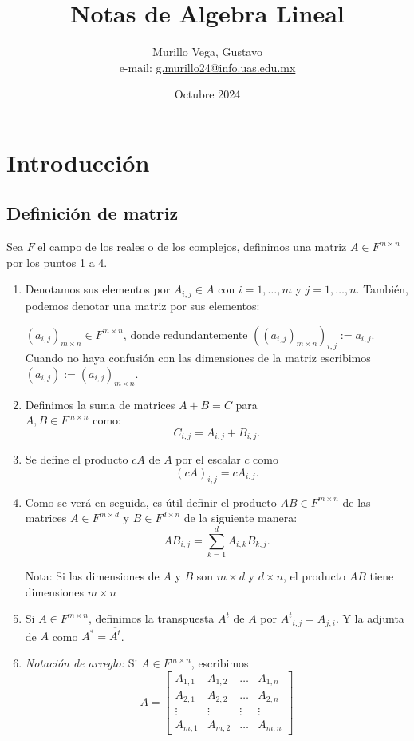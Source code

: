 \documentclass{article}
\title{Notas de Algebra Lineal}
\author{Murillo Vega, Gustavo \\ e-mail:
\href{mailto:g.murillo24@info.uas.edu.mx}{g.murillo24@info.uas.edu.mx}}
\date{Octubre 2024}
\begin{document}
\maketitle

\section{Introducción}
\subsection{Definición de matriz}
Sea ${F}$ el campo de los reales o de los complejos, definimos una matriz $A\in {F}^{m\times n}$ por los puntos 1 a 4.
\begin{enumerate}
    \item Denotamos sus elementos por $A_{i,j}\in A$ con  $i=1,\ldots,m$ y $j=1,\ldots,n$. También, podemos denotar una matriz por sus elementos:
    
    $(a_{i,j})_{m\times n} \in {F}^{m\times n}$, donde redundantemente $((a_{i,j})_{m\times n})_{i,j} := a_{i,j}$.\\
    Cuando no haya confusión con las dimensiones de la matriz
    escribimos\\ $(a_{i,j}) := (a_{i,j})_{m\times n}$.
    
    \item Definimos la suma de matrices $A+B = C$ para
    \\ $A, B \in {F}^{m\times n}$ como:
    $$C_{i,j}=A_{i,j} + B_{i,j}.$$

    \item Se define el producto $cA$ de $A$ por el escalar $c$
    como $$(cA)_{i,j} = cA_{i,j}.$$
    
    \item Como se verá en seguida, es útil definir el producto
    $AB\in {F}^{m\times n}$ de las matrices $A\in {F}^{m\times d}$ y
    $B \in {F}^{d\times n}$ de la siguiente manera:
    $$AB_{i,j} = \sum^d_{k=1} A_{i,k} B_{k,j}.$$
    
    Nota: Si las dimensiones de $A$ y $B$ son $m\times d$
    y $d\times n$, el producto $AB$ tiene dimensiones $m\times n$

    \item Si $A\in F^{m\times n}$, definimos la transpuesta $A^t$
    de $A$ por ${A^t}_{i,j} = A_{j,i}$.
    Y la adjunta de $A$ como $A^* = \overline{A^t}$.

    \item \textit{Notación de arreglo:} Si
    $A\in {F}^{m\times n}$, escribimos
    $$A = \begin{bmatrix}
        A_{1,1} & A_{1,2} & \ldots & A_{1, n} \\
        A_{2,1} & A_{2,2} & \ldots & A_{2, n} \\
        \vdots & \vdots & \vdots & \vdots \\
        A_{m,1} & A_{m,2} & \ldots & A_{m, n}
    \end{bmatrix}$$
\end{enumerate}
\end{document}
